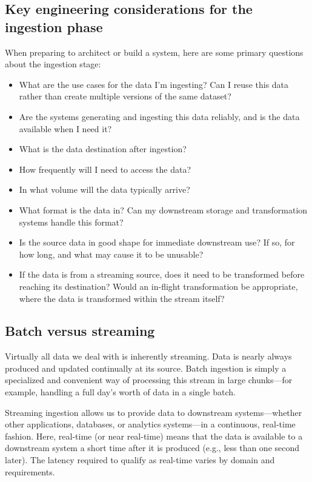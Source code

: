 \subsection*{Key engineering considerations for the ingestion phase}
When preparing to architect or build a system, here are some primary questions
about the ingestion stage:
\begin{itemize}
    \item What are the use cases for the data I'm ingesting? Can I reuse this data rather than create multiple versions of the same dataset?
    \item Are the systems generating and ingesting this data reliably, and is the data available when I need it?
    \item What is the data destination after ingestion?
    \item How frequently will I need to access the data?
    \item In what volume will the data typically arrive?
    \item What format is the data in? Can my downstream storage and transformation systems handle this format?
    \item Is the source data in good shape for immediate downstream use? If so, for how long, and what may cause it to be unusable?
    \item If the data is from a streaming source, does it need to be transformed before reaching its destination? Would an in-flight transformation be appropriate, where the data is transformed within the stream itself?
\end{itemize}


\subsection*{Batch versus streaming}
Virtually all data we deal with is inherently streaming. Data is nearly always produced
and updated continually at its source. Batch ingestion is simply a specialized and
convenient way of processing this stream in large chunks—for example, handling a
full day's worth of data in a single batch.

Streaming ingestion allows us to provide data to downstream systems—whether
other applications, databases, or analytics systems—in a continuous, real-time fashion.
Here, real-time (or near real-time) means that the data is available to a downstream
system a short time after it is produced (e.g., less than one second later). The
latency required to qualify as real-time varies by domain and requirements.

